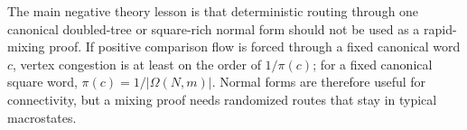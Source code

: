 The main negative theory lesson is that deterministic routing through one
canonical doubled-tree or square-rich normal form should not be used as a
rapid-mixing proof.  If positive comparison flow is forced through a fixed
canonical word $c$, vertex congestion is at least on the order of $1/\pi(c)$;
for a fixed canonical square word, $\pi(c)=1/|\Omega(N,m)|$.  Normal forms are
therefore useful for connectivity, but a mixing proof needs randomized routes
that stay in typical macrostates.
